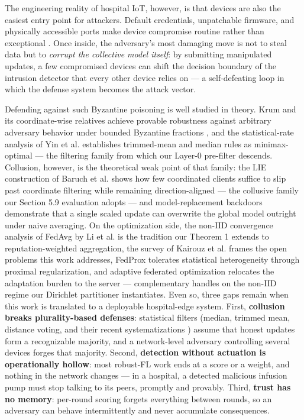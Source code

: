 \documentclass[cmc,article,submit,moreauthors,pdftex]{Definitions/tsp}
\begin{document}
The engineering reality of hospital IoT, however, is that devices are also the easiest entry point for attackers. Default credentials, unpatchable firmware, and physically accessible ports make device compromise routine rather than exceptional \cite{ref-11}. Once inside, the adversary's most damaging move is not to steal data but to \emph{corrupt the collective model itself}: by submitting manipulated updates, a few compromised devices can shift the decision boundary of the intrusion detector that every other device relies on --- a self-defeating loop in which the defense system becomes the attack vector.

Defending against such Byzantine poisoning is well studied in theory. Krum and its coordinate-wise relatives achieve provable robustness against arbitrary adversary behavior under bounded Byzantine fractions \cite{ref-12}, and the statistical-rate analysis of Yin et al. \cite{ref-13} establishes trimmed-mean and median rules as minimax-optimal --- the filtering family from which our Layer-0 pre-filter descends. Collusion, however, is the theoretical weak point of that family: the LIE construction of Baruch et al. \cite{ref-14} shows how few coordinated clients suffice to slip past coordinate filtering while remaining direction-aligned --- the collusive family our Section 5.9 evaluation adopts --- and model-replacement backdoors \cite{ref-15} demonstrate that a single scaled update can overwrite the global model outright under naive averaging. On the optimization side, the non-IID convergence analysis of FedAvg by Li et al. \cite{ref-16} is the tradition our Theorem 1 extends to reputation-weighted aggregation, the survey of Kairouz et al. \cite{ref-17} frames the open problems this work addresses, FedProx \cite{ref-18} tolerates statistical heterogeneity through proximal regularization, and adaptive federated optimization \cite{ref-19} relocates the adaptation burden to the server --- complementary handles on the non-IID regime our Dirichlet partitioner instantiates. Even so, three gaps remain when this work is translated to a deployable hospital-edge system. First, \textbf{collusion breaks plurality-based defenses}: statistical filters (median, trimmed mean, distance voting, and their recent systematizations \cite{ref-20}) assume that honest updates form a recognizable majority, and a network-level adversary controlling several devices forges that majority. Second, \textbf{detection without actuation is operationally hollow}: most robust-FL work ends at a score or a weight, and nothing in the network changes --- in a hospital, a detected malicious infusion pump must stop talking to its peers, promptly and provably. Third, \textbf{trust has no memory}: per-round scoring \cite{ref-21} forgets everything between rounds, so an adversary can behave intermittently and never accumulate consequences.
\end{document}
